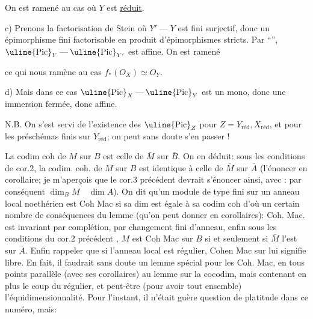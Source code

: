 On est ramené au cas où $Y$ est \uline{réduit}.

c) Prenons la factorisation de Stein
où $Y'\mathbin{\text{---}}Y$ est fini surjectif, donc un épimorphisme fini factorisable en produit d'épimorphismes stricts. Par ``'', $\uline{\mathrm{Pic}}_Y\mathbin{\text{---}}\uline{\mathrm{Pic}}_{Y'}$ est affine. On est ramené



ce qui nous ramène au cas $f_*(O_X)\simeq O_Y$.

d) Mais dans ce cas  $\uline{\mathrm{Pic}}_X\mathbin{\text{---}}\uline{\mathrm{Pic}}_Y$ est un mono, donc   une immersion fermée, donc affine.


N.B. On s'est servi de l'existence des $\uline{\mathrm{Pic}}_Z$ pour $Z=Y_{\mathrm{réd}},X_{\mathrm{réd}}$, et pour les préschémas finis sur $Y_{\mathrm{réd}}$;  on peut sans doute s'en passer !

La codim coh de $M$ sur $B$ est celle de $\bar M$ sur $\bar B$. On en déduit: sous les conditions de cor.2, la codim. coh. de $M$ sur $B$ est identique à celle de $\bar M$ sur $\bar A$ (l'énoncer en corollaire; je m'aperçois que le cor.3 précédent devrait s'énoncer ainsi, avec : par conséquent $\dim_B M\quad\dim A$). On dit qu'un module de type fini sur un anneau local noethérien est Coh Mac si sa dim est égale à sa codim coh d'où un certain nombre de conséquences du lemme (qu'on peut donner en corollaires): Coh. Mac. est invariant par complétion, par changement fini d'anneau, enfin sous les conditions du cor.2 précédent , $M$ est Coh Mac sur $B$ si et seulement si $\bar M$ l'est sur $\bar A$. Enfin rappeler que si l'anneau local est régulier, Cohen Mac sur lui signifie libre. En fait, il faudrait sans doute un lemme spécial pour les Coh. Mac, en tous points parallèle (avec ses corollaires) au lemme sur la cocodim, mais contenant en plus le coup du régulier, et peut-être (pour avoir tout ensemble) l'équidimensionnalité. Pour l'instant, il n'était guère question de platitude dans ce numéro, mais:

